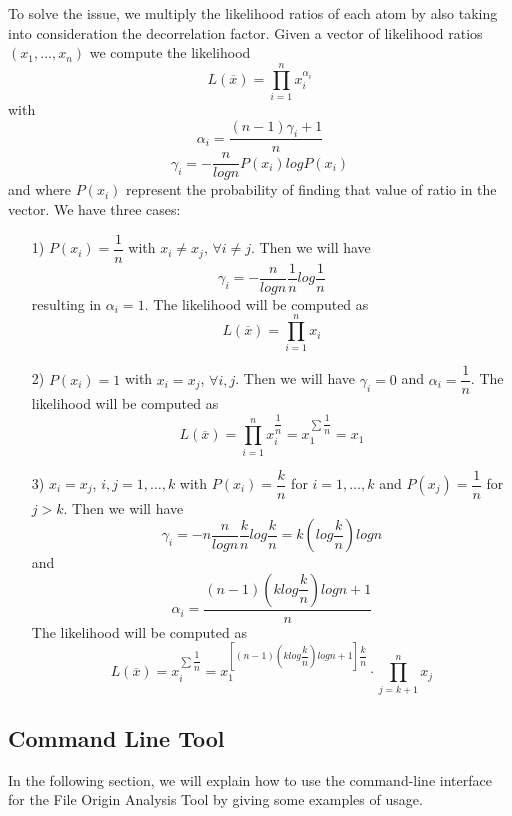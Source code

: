To solve the issue, we multiply the likelihood ratios of each atom by also taking into consideration the decorrelation factor.
Given a vector of likelihood ratios $(x_{1},\ldots,x_{n})$ we compute the likelihood $$ L(\overline{x}) = \prod\limits_{i=1}^{n} x_{i}^{\alpha_{i}} $$ with $$ \alpha_{i} = \dfrac{(n-1)\gamma_{i}+1}{n} $$ $$ \gamma_{i} = - \dfrac{n}{log n} P(x_{i})log P(x_{i}) $$ and where $P(x_{i})$ represent the probability of finding that value of ratio in the vector.
We have three cases:

\begin{itemize}

\item[1)] $P(x_{i}) = \dfrac{1}{n} $ with $x_{i} \neq x_{j}$, $ \forall i \neq j $.
Then we will have $$ \gamma_{i} = - \dfrac{n}{log n} \dfrac{1}{n} log\dfrac{1}{n} $$ resulting in $\alpha_{i} = 1$.
The likelihood will be computed as $$L(\overline{x}) = \prod\limits_{i=1}^{n} x_{i} $$

\item[2)] $P(x_{i}) = 1 $ with $x_{i} = x_{j}$, $ \forall i,j $.
Then we will have $ \gamma_{i} = 0 $ and $\alpha_{i} = \dfrac{1}{n} $.
The likelihood will be computed as $$L(\overline{x}) = \prod\limits_{i=1}^{n} x_{i}^{\dfrac{1}{n}} = x_{1}^{\sum \dfrac{1}{n}} = x_{1} $$

\item[3)]  $x_{i} = x_{j}$, $ i,j = 1,\ldots,k $ with $P(x_{i}) = \dfrac{k}{n} $ for $i = 1,\ldots,k$ and $P(x_{j}) = \dfrac{1}{n}$ for $j > k$.
Then we will have $$ \gamma_{i} = -n \dfrac{n}{log n} \dfrac{k}{n} log \dfrac{k}{n} = k (log \dfrac{k}{n})log n $$ and 
$$ \alpha_{i} = \dfrac{(n-1)(k log \dfrac{k}{n})log n + 1}{n} $$
The likelihood will be computed as $$L(\overline{x}) = x_{i}^{\sum \dfrac{1}{n}} = x_{1}^{\left[ (n-1)(k log \dfrac{k}{n})log n + 1 \right] \dfrac{k}{n}} \cdot \prod\limits_{j=k+1}^{n} x_{j}  $$

\end{itemize}

\subsection{Command Line Tool}


In the following section, we will explain how to use the command-line interface for the File Origin Analysis Tool by giving some examples of usage.

